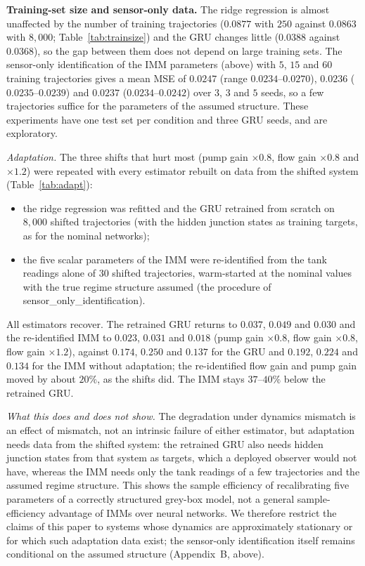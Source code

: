 \documentclass[conference]{IEEEtran}
\begin{document}
\textbf{Training-set size and sensor-only data.} The ridge regression is almost unaffected by the number of training trajectories ($0.0877$ with $250$ against $0.0863$ with $8{,}000$; Table~\ref{tab:trainsize}) and the GRU changes little ($0.0388$ against $0.0368$), so the gap between them does not depend on large training sets. The sensor-only identification of the IMM parameters (above) with $5$, $15$ and $60$ training trajectories gives a mean MSE of $0.0247$ (range $0.0234$--$0.0270$), $0.0236$ ($0.0235$--$0.0239$) and $0.0237$ ($0.0234$--$0.0242$) over $3$, $3$ and $5$ seeds, so a few trajectories suffice for the parameters of the assumed structure. These experiments have one test set per condition and three GRU seeds, and are exploratory.

\emph{Adaptation.} The three shifts that hurt most (pump gain $\times0.8$, flow gain $\times0.8$ and $\times1.2$) were repeated with every estimator rebuilt on data from the shifted system (Table~\ref{tab:adapt}):
\begin{itemize}
\item the ridge regression was refitted and the GRU retrained from scratch on $8{,}000$ shifted trajectories (with the hidden junction states as training targets, as for the nominal networks);
\item the five scalar parameters of the IMM were re-identified from the tank readings alone of $30$ shifted trajectories, warm-started at the nominal values with the true regime structure assumed (the procedure of sensor\_only\_identification).
\end{itemize}
All estimators recover. The retrained GRU returns to $0.037$, $0.049$ and $0.030$ and the re-identified IMM to $0.023$, $0.031$ and $0.018$ (pump gain $\times0.8$, flow gain $\times0.8$, flow gain $\times1.2$), against $0.174$, $0.250$ and $0.137$ for the GRU and $0.192$, $0.224$ and $0.134$ for the IMM without adaptation; the re-identified flow gain and pump gain moved by about $20\%$, as the shifts did. The IMM stays $37$--$40\%$ below the retrained GRU.

\emph{What this does and does not show.} The degradation under dynamics mismatch is an effect of mismatch, not an intrinsic failure of either estimator, but adaptation needs data from the shifted system: the retrained GRU also needs hidden junction states from that system as targets, which a deployed observer would not have, whereas the IMM needs only the tank readings of a few trajectories and the assumed regime structure. This shows the sample efficiency of recalibrating five parameters of a correctly structured grey-box model, not a general sample-efficiency advantage of IMMs over neural networks. We therefore restrict the claims of this paper to systems whose dynamics are approximately stationary or for which such adaptation data exist; the sensor-only identification itself remains conditional on the assumed structure (Appendix~B, above).
\end{document}
